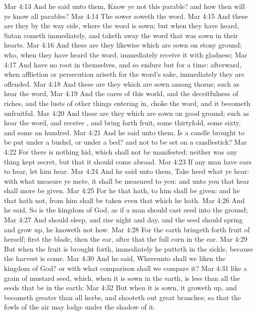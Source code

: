 \vs Mar 4:13 And he said unto them, Know ye not this parable? and how then will ye know all parables?
\vs Mar 4:14 The sower soweth the word.
\vs Mar 4:15 And these are they by the way side, where the word is sown; but when they have heard, Satan cometh immediately, and taketh away the word that was sown in their hearts.
\vs Mar 4:16 And these are they likewise which are sown on stony ground; who, when they have heard the word, immediately receive it with gladness;
\vs Mar 4:17 And have no root in themselves, and so endure but for a time: afterward, when affliction or persecution ariseth for the word's sake, immediately they are offended.
\vs Mar 4:18 And these are they which are sown among thorns; such as hear the word,
\vs Mar 4:19 And the cares of this world, and the deceitfulness of riches, and the lusts of other things entering in, choke the word, and it becometh unfruitful.
\vs Mar 4:20 And these are they which are sown on good ground; such as hear the word, and receive , and bring forth fruit, some thirtyfold, some sixty, and some an hundred.
\vs Mar 4:21 And he said unto them, Is a candle brought to be put under a bushel, or under a bed? and not to be set on a candlestick?
\vs Mar 4:22 For there is nothing hid, which shall not be manifested; neither was any thing kept secret, but that it should come abroad.
\vs Mar 4:23 If any man have ears to hear, let him hear.
\vs Mar 4:24 And he said unto them, Take heed what ye hear: with what measure ye mete, it shall be measured to you: and unto you that hear shall more be given.
\vs Mar 4:25 For he that hath, to him shall be given: and he that hath not, from him shall be taken even that which he hath.
\vs Mar 4:26 And he said, So is the kingdom of God, as if a man should cast seed into the ground;
\vs Mar 4:27 And should sleep, and rise night and day, and the seed should spring and grow up, he knoweth not how.
\vs Mar 4:28 For the earth bringeth forth fruit of herself; first the blade, then the ear, after that the full corn in the ear.
\vs Mar 4:29 But when the fruit is brought forth, immediately he putteth in the sickle, because the harvest is come.
\vs Mar 4:30 And he said, Whereunto shall we liken the kingdom of God? or with what comparison shall we compare it?
\vs Mar 4:31  like a grain of mustard seed, which, when it is sown in the earth, is less than all the seeds that be in the earth:
\vs Mar 4:32 But when it is sown, it groweth up, and becometh greater than all herbs, and shooteth out great branches; so that the fowls of the air may lodge under the shadow of it.
